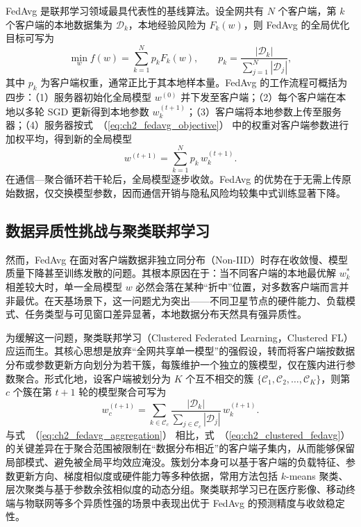 FedAvg 是联邦学习领域最具代表性的基线算法。设全网共有 $N$ 个客户端，第 $k$ 个客户端的本地数据集为 $\mathcal{D}_k$，本地经验风险为 $F_k(w)$，则 FedAvg 的全局优化目标可写为
\begin{equation}
  \min_{w} f(w) = \sum_{k=1}^{N} p_k F_k(w),\qquad
  p_k = \frac{|\mathcal{D}_k|}{\sum_{j=1}^{N} |\mathcal{D}_j|},
  \label{eq:ch2_fedavg_objective}
\end{equation}
其中 $p_k$ 为客户端权重，通常正比于其本地样本量。FedAvg 的工作流程可概括为四步：（1）服务器初始化全局模型 $w^{(0)}$ 并下发至客户端；（2）每个客户端在本地以多轮 SGD 更新得到本地参数 $w_k^{(t+1)}$；（3）客户端将本地参数上传至服务器；（4）服务器按式~（\ref{eq:ch2_fedavg_objective}） 中的权重对客户端参数进行加权平均，得到新的全局模型
\begin{equation}
  w^{(t+1)} = \sum_{k=1}^{N} p_k\, w_k^{(t+1)}.
  \label{eq:ch2_fedavg_aggregation}
\end{equation}
在通信—聚合循环若干轮后，全局模型逐步收敛。FedAvg 的优势在于无需上传原始数据，仅交换模型参数，因而通信开销与隐私风险均较集中式训练显著下降\cite{McMahan2017,LiFedAvg2020}。

\subsection{数据异质性挑战与聚类联邦学习}
\label{subsec:ch2_clustered_fl}

然而，FedAvg 在面对客户端数据非独立同分布（Non-IID）时存在收敛慢、模型质量下降甚至训练发散的问题\cite{Li2020FedProx,Karimireddy2020Scaffold,Zou2024FL,FedFusion2024}。其根本原因在于：当不同客户端的本地最优解 $w_k^*$ 相差较大时，单一全局模型 $w$ 必然会落在某种“折中”位置，对多数客户端而言并非最优。在天基场景下，这一问题尤为突出——不同卫星节点的硬件能力、负载模式、任务类型与可见窗口差异显著，本地数据分布天然具有强异质性。

为缓解这一问题，聚类联邦学习（Clustered Federated Learning，Clustered FL）应运而生。其核心思想是放弃“全网共享单一模型”的强假设，转而将客户端按数据分布或参数更新方向划分为若干簇，每簇维护一个独立的簇模型，仅在簇内进行参数聚合。形式化地，设客户端被划分为 $K$ 个互不相交的簇 $\{\mathcal{C}_1, \mathcal{C}_2, \ldots, \mathcal{C}_K\}$，则第 $c$ 个簇在第 $t+1$ 轮的模型聚合可写为
\begin{equation}
  w_c^{(t+1)} = \sum_{k \in \mathcal{C}_c} \frac{|\mathcal{D}_k|}{\sum_{j \in \mathcal{C}_c} |\mathcal{D}_j|}\, w_k^{(t+1)}.
  \label{eq:ch2_clustered_fedavg}
\end{equation}
与式~（\ref{eq:ch2_fedavg_aggregation}） 相比，式~（\ref{eq:ch2_clustered_fedavg}） 的关键差异在于聚合范围被限制在“数据分布相近”的客户端子集内，从而能够保留局部模式、避免被全局平均效应淹没。簇划分本身可以基于客户端的负载特征、参数更新方向、梯度相似度或硬件能力等多种依据，常用方法包括 $k$-means 聚类、层次聚类与基于参数余弦相似度的动态分组\cite{sattler2021clusteredfl,Zou2024FL,FedFusion2024}。聚类联邦学习已在医疗影像、移动终端与物联网等多个异质性强的场景中表现出优于 FedAvg 的预测精度与收敛稳定性。


